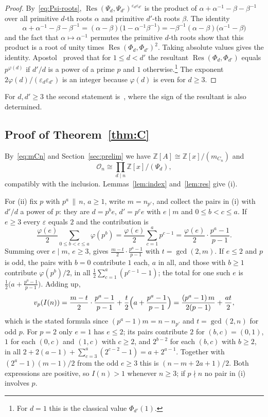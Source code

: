 \documentclass[11pt]{amsart}
\theoremstyle{definition}
\theoremstyle{remark}
\numberwithin{equation}{section}
\newcommand{\Z}{\mathbb{Z}}
\newcommand{\cO}{\mathcal{O}}
\newcommand{\Res}{\operatorname{Res}}
\begin{document}
\begin{proof}
By~\eqref{eq:Psi-roots}, $\Res(\Psi_d,\Psi_{d'})^{\varepsilon_d\varepsilon_{d'}}$ is the product of $\alpha+\alpha^{-1}-\beta-\beta^{-1}$ over all primitive $d$-th roots $\alpha$ and primitive $d'$-th roots $\beta$. The identity
\[
\alpha+\alpha^{-1}-\beta-\beta^{-1}=(\alpha-\beta)\bigl(1-\alpha^{-1}\beta^{-1}\bigr)=-\beta^{-1}(\alpha-\beta)\bigl(\alpha^{-1}-\beta\bigr)
\]
and the fact that $\alpha\mapsto\alpha^{-1}$ permutes the primitive $d$-th roots show that this product is a root of unity times $\Res(\Phi_d,\Phi_{d'})^2$. Taking absolute values gives the identity. Apostol~\cite{Ap} proved that for $1\le d<d'$ the resultant $\Res(\Phi_d,\Phi_{d'})$ equals $p^{\varphi(d)}$ if $d'/d$ is a power of a prime $p$ and $1$ otherwise.\footnote{For $d=1$ this is the classical value $\Phi_{d'}(1)$.} The exponent $2\varphi(d)/(\varepsilon_d\varepsilon_{d'})$ is an integer because $\varphi(d)$ is even for $d\ge3$.
\end{proof}

For $d,d'\ge3$ the second statement is~\cite[Theorem~3.4]{LW}, where the sign of the resultant is also determined.

\subsection{Proof of Theorem~\ref{thm:C}}
By~\eqref{eq:mCn} and Section~\ref{sec:prelim} we have $\Z[A]\cong\Z[x]/(m_{C_n})$ and
\[
\cO_n\cong\prod_{d\mid n}\Z[x]/(\Psi_d),
\]
compatibly with the inclusion. Lemmas~\ref{lem:index} and~\ref{lem:res} give (i).

For (ii) fix $p$ with $p^a\,\|\,n$, $a\ge1$, write $m=n_{p'}$, and collect the pairs in (i) with $d'/d$ a power of $p$: they are $d=p^be$, $d'=p^ce$ with $e\mid m$ and $0\le b<c\le a$. If $e\ge3$ every $\varepsilon$ equals $2$ and the contribution is
\[
\frac{\varphi(e)}{2}\sum_{0\le b<c\le a}\varphi(p^b)=\frac{\varphi(e)}{2}\sum_{c=1}^{a}p^{c-1}=\frac{\varphi(e)}{2}\cdot\frac{p^a-1}{p-1}.
\]
Summing over $e\mid m$, $e\ge3$, gives $\frac{m-t}{2}\cdot\frac{p^a-1}{p-1}$ with $t=\gcd(2,m)$. If $e\le2$ and $p$ is odd, the pairs with $b=0$ contribute $1$ each, $a$ in all, and those with $b\ge1$ contribute $\varphi(p^b)/2$, in all $\frac12\sum_{c=1}^{a}(p^{c-1}-1)$; the total for one such $e$ is $\frac12\bigl(a+\frac{p^a-1}{p-1}\bigr)$. Adding up,
\[
v_p(I(n))=\frac{m-t}{2}\cdot\frac{p^a-1}{p-1}+\frac t2\Bigl(a+\frac{p^a-1}{p-1}\Bigr)=\frac{(p^a-1)\,m}{2(p-1)}+\frac{at}{2},
\]
which is the stated formula since $(p^a-1)m=n-n_{p'}$ and $t=\gcd(2,n)$ for odd $p$. For $p=2$ only $e=1$ has $e\le2$; its pairs contribute $2$ for $(b,c)=(0,1)$, $1$ for each $(0,c)$ and $(1,c)$ with $c\ge2$, and $2^{b-2}$ for each $(b,c)$ with $b\ge2$, in all $2+2(a-1)+\sum_{c=3}^{a}(2^{c-2}-1)=a+2^{a-1}$. Together with $(2^a-1)(m-1)/2$ from the odd $e\ge3$ this is $(n-m+2a+1)/2$. Both expressions are positive, so $I(n)>1$ whenever $n\ge3$; if $p\nmid n$ no pair in (i) involves $p$.
\end{document}
